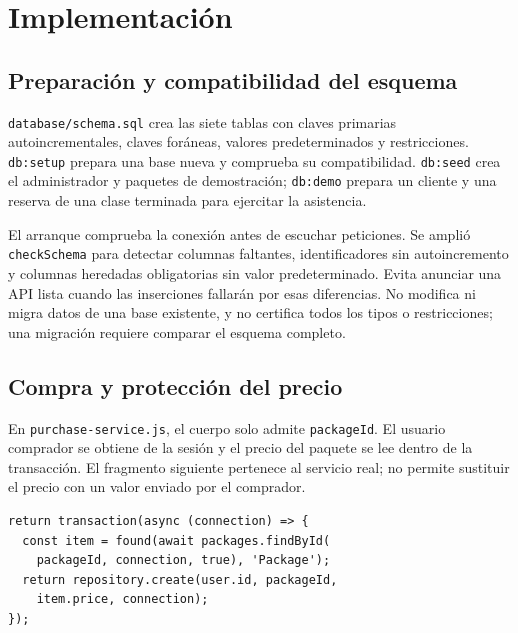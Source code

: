 \section{Implementación}\label{sec:implementacion-laura}
\subsection{Preparación y compatibilidad del esquema}
\texttt{database/schema.sql} crea las siete tablas con claves primarias autoincrementales, claves foráneas, valores predeterminados y restricciones. \texttt{db:setup} prepara una base nueva y comprueba su compatibilidad. \texttt{db:seed} crea el administrador y paquetes de demostración; \texttt{db:demo} prepara un cliente y una reserva de una clase terminada para ejercitar la asistencia.

El arranque comprueba la conexión antes de escuchar peticiones. Se amplió \texttt{checkSchema} para detectar columnas faltantes, identificadores sin autoincremento y columnas heredadas obligatorias sin valor predeterminado. Evita anunciar una API lista cuando las inserciones fallarán por esas diferencias. No modifica ni migra datos de una base existente, y no certifica todos los tipos o restricciones; una migración requiere comparar el esquema completo.

\subsection{Compra y protección del precio}
En \texttt{purchase-service.js}, el cuerpo solo admite \texttt{packageId}. El usuario comprador se obtiene de la sesión y el precio del paquete se lee dentro de la transacción. El fragmento siguiente pertenece al servicio real; no permite sustituir el precio con un valor enviado por el comprador.
\begin{lstlisting}[caption={Precio de compra elegido por el servidor.}]
return transaction(async (connection) => {
  const item = found(await packages.findById(
    packageId, connection, true), 'Package');
  return repository.create(user.id, packageId,
    item.price, connection);
});
\end{lstlisting}

